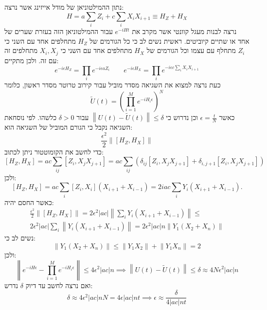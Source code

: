 \documentclass{tstextbook}
\begin{document}
\begin{example}
נתון ההמילטוניאן של מודל אייזינג אשר נרצה:
$$H=a{\sum_{i}}Z_{i}+c{\sum_{i}}X_{i}X_{i+1}\equiv H_{Z}+H_{X}$$
נרצה לבנות מעגל קוונטי אשר מקרב את \(e^{ -iHt }\) עבור ההמילטוניאן הזה בעזרת שערים של אחד או שתיים קיוביטים. ראשית נשים לב כי כל הגורמים של \(H_{Z}\) מתחלפים אחד עם השני כי \(Z_{i}\) מתחלף עם עצמו וכל הגורמים של \(H_{X}\) מתחלפים אחד עם השני כי \(X_{i},X_{j}\) מתחלפים זה עם זה. ולכן מתקיים:
$$e^{ -i\epsilon H_{Z} }=\prod_{i}e^{ -i\epsilon aZ_{i}}\qquad e^{ -i\epsilon H_{X} }=\prod_{i}e^{ -i\epsilon c\sum_{i}X_{i}X_{i+1} }$$
כעת נרצה למצוא את השגיאה מסדר מוביל עבור קירוב טרוטר מסדר ראשון, כלומר $$\widetilde{U}\left(t\right)=\left(\prod_{i=1}^{M}e^{-i H_{i}\epsilon}\right)^{N}$$ כאשר \(\epsilon=\frac{t}{N}\) וכן נדרוש כי \(\left\lVert  U(t)-\tilde{U}(t)  \right\rVert\leq \delta\) עבור \(\delta> 0\) כלשהו. לפי נוסחאת השגיאה נקבל כי הגורם המוביל של השגיאה הוא:
$$\frac{\epsilon^{2}}{2}\left\|\left[H_{Z},H_{X}\right]\right\|$$
כדי לחשב את הקומוטטור ניתן לכתוב:
$$[H_{Z},H_{X}]=a c{\sum_{i j}{\left[Z_{i},X_{j}X_{j+1}\right]}}=a c{\sum_{i j}{\left(\delta_{i j}\left[Z_{i},X_{j}X_{j+1}\right]+\delta_{i,j+1}\left[Z_{i},X_{j}X_{j+1}\right]\right)}}$$
ולכן:
$$\left[H_{Z},H_{X}\right]=a c{\sum_{i}\left[Z_{i},X_{i}\right]\left(X_{i+1}+X_{i-1}\right)}=2i a c{\sum_{i}}Y_{i}\left(X_{i+1}+X_{i-1}\right).$$
כאשר החסם יהיה:
\begin{gather*}\frac{\epsilon^{2}}{2}\left\|\left[H_{Z},H_{X}\right]\right\|=2\epsilon^{2}\left|a c\right|\left\|\sum_{i}Y_{i}\left(X_{i+1}+X_{i-1}\right)\right\|\leq\\ 2\epsilon^{2}\left|a c\right|\sum_{i}\left\|Y_{i}\left(X_{i+1}+X_{i-1}\right)\right\|{=}2\epsilon^{2}\left|a c\right|n\left\|Y_{1}\left(X_{2}{+}X_{n}\right)\right\| 
\end{gather*}
נשים לב כי:
$$\left\|Y_{1}\left(X_{2}+X_{n}\right)\right\|\leq\left\|Y_{1}X_{2}\right\|+\left\|Y_{1}X_{n}\right\|=2$$
ולכן:
$$\left\|e^{-i H\epsilon}-\prod_{i=1}^{M}e^{-i H_{i}\epsilon}\right\|\leq4\epsilon^{2}\left|a c\right|n\implies \left\|U\left(t\right)-\widetilde{U}\left(t\right)\right\|\leq\delta\approx4N\epsilon^{2}\left|a c\right|n$$
ואם נרצה לחשב עד דיוק \(\delta\) נדרש:
$$\delta\approx4\epsilon^{2}\left|a c\right|n N=4\epsilon\left|a c\right|n t\implies\epsilon\approx\frac{\delta}{4\left|a c\right|n t}$$

\end{example}
\end{document}
